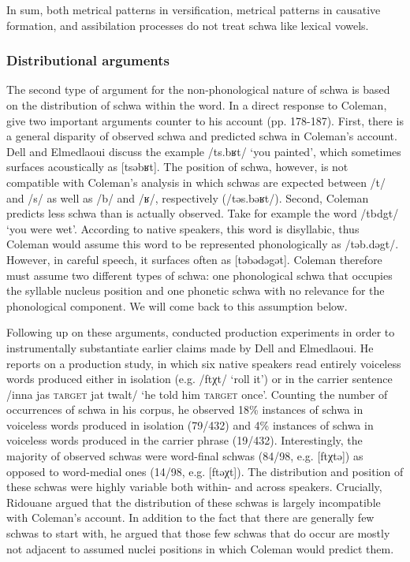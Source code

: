 In sum, both metrical patterns in versification, metrical patterns in causative formation, and assibilation processes do not treat schwa like lexical vowels.

\subsubsection{Distributional arguments}
The second type of argument for the non-phonological nature of schwa is based on the distribution of schwa within the word. In a direct response to Coleman, \citet{DE2002} give two important arguments counter to his account (pp. 178-187). First, there is a general disparity of observed schwa and predicted schwa in Coleman’s account. Dell and Elmedlaoui discuss the example /ts.bʁt/ ‘you painted’, which sometimes surfaces acoustically as [tsəbʁt]. The position of schwa, however, is not compatible with Coleman’s analysis in which schwas are expected between /t/ and /s/ as well as /b/ and /ʁ/, respectively (/təs.bəʁt/). Second, Coleman predicts less schwa than is actually observed. Take for example the word /tbdgt/ ‘you were wet’. According to native speakers, this word is disyllabic, thus Coleman would assume this word to be represented phonologically as /təb.dəgt/. However, in careful speech, it surfaces often as [təbədəgət]. Coleman therefore must assume two different types of schwa: one phonological schwa that occupies the syllable nucleus position and one phonetic schwa with no relevance for the phonological component. We will come back to this assumption below.

Following up on these arguments, \citet{Ridouane2008} conducted production experiments in order to instrumentally substantiate earlier claims made by Dell and Elmedlaoui. He reports on a production study, in which six native speakers read entirely voiceless words produced either in isolation (e.g. /ftχt/ ‘roll it’) or in the carrier sentence /inna jas \textsc{target} jat twalt/ ‘he told him \textsc{target} once’. Counting the number of occurrences of schwa in his corpus, he observed 18\% instances of schwa in voiceless words produced in isolation (79/432) and 4\% instances of schwa in voiceless words produced in the carrier phrase (19/432). Interestingly, the majority of observed schwas were word-final schwas (84/98, e.g. [ftχtə]) as opposed to word-medial ones (14/98, e.g. [ftəχt]). The distribution and position of these schwas were highly variable both within- and across speakers. Crucially, Ridouane argued that the distribution of these schwas is largely incompatible with Coleman’s account. In addition to the fact that there are generally few schwas to start with, he argued that those few schwas that do occur are mostly not adjacent to assumed nuclei positions in which Coleman would predict them. 

